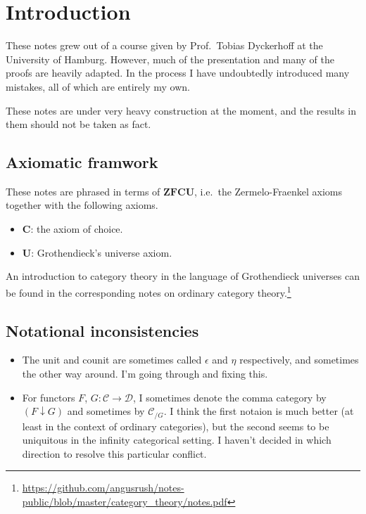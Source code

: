 \documentclass[main.tex]{subfiles}
\begin{document}
\chapter{Introduction}
\label{ch:introduction}

These notes grew out of a course given by Prof.\ Tobias Dyckerhoff at the University of Hamburg. However, much of the presentation and many of the proofs are heavily adapted. In the process I have undoubtedly introduced many mistakes, all of which are entirely my own.

These notes are under very heavy construction at the moment, and the results in them should not be taken as fact.

\section{Axiomatic framwork}
\label{sec:axiomatic_framwork}

These notes are phrased in terms of $\mathbf{ZFCU}$, i.e.\ the Zermelo-Fraenkel axioms together with the following axioms.
\begin{itemize}
  \item $\mathbf{C}$: the axiom of choice.

  \item $\mathbf{U}$: Grothendieck's universe axiom.
\end{itemize}

An introduction to category theory in the language of Grothendieck universes can be found in the corresponding notes on ordinary category theory.\footnote{\url{https://github.com/angusrush/notes-public/blob/master/category_theory/notes.pdf}}

\section{Notational inconsistencies}
\label{sec:notation}

\begin{itemize}
  \item The unit and counit are sometimes called $\epsilon$ and $\eta$ respectively, and sometimes the other way around. I'm going through and fixing this.

  \item For functors $F$, $G\colon \mathcal{C} \to \mathcal{D}$, I sometimes denote the comma category by $(F \downarrow G)$ and sometimes by $\mathcal{C}_{/G}$. I think the first notaion is much better (at least in the context of ordinary categories), but the second seems to be uniquitous in the infinity categorical setting. I haven't decided in which direction to resolve this particular conflict.
\end{itemize}
\end{document}
